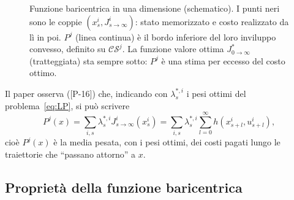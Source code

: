 \documentclass[11pt,a4paper]{article}
\theoremstyle{definition}
\theoremstyle{plain}
\theoremstyle{remark}
\newcommand{\CS}{\mathcal{CS}}
\newcommand{\Jstar}{J^{*}_{0\to\infty}}
\newcommand{\eqp}[1]{\textup{[P-#1]}}   %
\begin{document}
\begin{figure}[h]
\centering
{}
\caption{Funzione baricentrica in una dimensione (schematico). I punti neri
sono le coppie $(x^i_s, J^i_{s\to\infty})$: stato memorizzato e costo
realizzato da lì in poi. $P^j$ (linea continua) è il bordo inferiore del loro
inviluppo convesso, definito su $\CS^j$. La funzione valore ottima $\Jstar$
(tratteggiata) sta sempre sotto: $P^j$ è una stima per eccesso del costo
ottimo.}
\label{fig:baricentrica}
\end{figure}

Il paper osserva (\eqp{16}) che, indicando con $\lambda^{*,i}_s$ i pesi ottimi
del problema~\eqref{eq:LP}, si può scrivere
\begin{equation}\label{eq:P-esplicita}
  P^j(x) = \sum_{i,s}\lambda^{*,i}_s J^i_{s\to\infty}(x^i_s)
  = \sum_{i,s}\lambda^{*,i}_s\sum_{l=0}^{\infty} h(x^i_{s+l},u^i_{s+l}),
\end{equation}
cioè $P^j(x)$ è la media pesata, con i pesi ottimi, dei costi pagati lungo le
traiettorie che ``passano attorno'' a $x$.

\subsection{Proprietà della funzione baricentrica}
\end{document}
